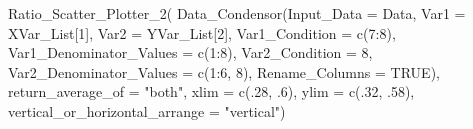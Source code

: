 \documentclass[
]{article}
\newenvironment{Shaded}{\begin{snugshade}}{\end{snugshade}}
\newcommand{\AttributeTok}[1]{\textcolor[rgb]{0.77,0.63,0.00}{#1}}
\newcommand{\ConstantTok}[1]{\textcolor[rgb]{0.00,0.00,0.00}{#1}}
\newcommand{\DecValTok}[1]{\textcolor[rgb]{0.00,0.00,0.81}{#1}}
\newcommand{\FunctionTok}[1]{\textcolor[rgb]{0.00,0.00,0.00}{#1}}
\newcommand{\NormalTok}[1]{#1}
\newcommand{\SpecialCharTok}[1]{\textcolor[rgb]{0.00,0.00,0.00}{#1}}
\newcommand{\StringTok}[1]{\textcolor[rgb]{0.31,0.60,0.02}{#1}}
\begin{document}
\begin{Shaded}
\begin{Highlighting}[]
\FunctionTok{Ratio\_Scatter\_Plotter\_2}\NormalTok{( }\FunctionTok{Data\_Condensor}\NormalTok{(}\AttributeTok{Input\_Data =}\NormalTok{ Data,}
                                        \AttributeTok{Var1 =}\NormalTok{ XVar\_List[}\DecValTok{1}\NormalTok{],}
                                        \AttributeTok{Var2 =}\NormalTok{ YVar\_List[}\DecValTok{2}\NormalTok{],}
                                        \AttributeTok{Var1\_Condition =} \FunctionTok{c}\NormalTok{(}\DecValTok{7}\SpecialCharTok{:}\DecValTok{8}\NormalTok{),}
                                        \AttributeTok{Var1\_Denominator\_Values =} \FunctionTok{c}\NormalTok{(}\DecValTok{1}\SpecialCharTok{:}\DecValTok{8}\NormalTok{),}
                                        \AttributeTok{Var2\_Condition =} \DecValTok{8}\NormalTok{, }
                                        \AttributeTok{Var2\_Denominator\_Values =} \FunctionTok{c}\NormalTok{(}\DecValTok{1}\SpecialCharTok{:}\DecValTok{6}\NormalTok{, }\DecValTok{8}\NormalTok{),}
                                        \AttributeTok{Rename\_Columns =} \ConstantTok{TRUE}\NormalTok{), }
                         \AttributeTok{return\_average\_of =} \StringTok{"both"}\NormalTok{,}
                         \AttributeTok{xlim =} \FunctionTok{c}\NormalTok{(.}\DecValTok{28}\NormalTok{, .}\DecValTok{6}\NormalTok{),}
                         \AttributeTok{ylim =} \FunctionTok{c}\NormalTok{(.}\DecValTok{32}\NormalTok{, .}\DecValTok{58}\NormalTok{),}
                         \AttributeTok{vertical\_or\_horizontal\_arrange =} \StringTok{"vertical"}\NormalTok{)}
\end{Highlighting}
\end{Shaded}
\end{document}
